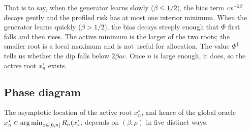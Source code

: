 That is to say, when the generator learns slowly ($\beta\le 1/2$), the bias term $cx^{-2\beta}$ decays gently and the profiled risk has at most one interior minimum. When the generator learns quickly ($\beta>1/2$), the bias decays steeply enough that $\Phi$ first falls and then rises. The active minimum is the larger of the two roots; the smaller root is a local maximum and is not useful for allocation. The value $\Phi^\dagger$ tells us whether the dip falls below $2\beta a c$. Once $n$ is large enough, it does, so the active root $x_n^\circ$ exists.

\subsection{Phase diagram}\label{ssec:phase}

The asymptotic location of the active root $x_n^\circ$, and hence of the global oracle $x_n^\star\in\operatorname*{arg\,min}_{x\in[0,n]}R_n(x)$, depends on $(\beta,\rho)$ in five distinct ways.

